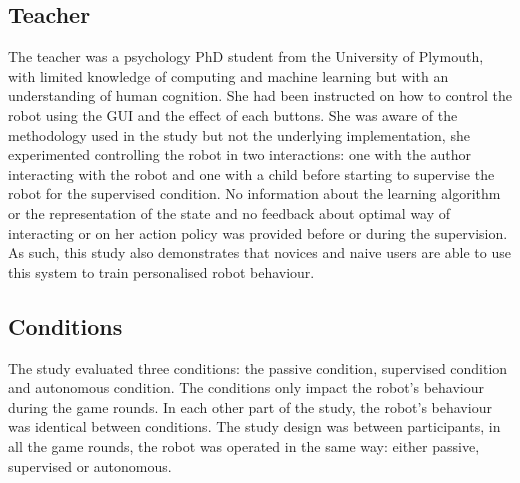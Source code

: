 \subsection{Teacher}
The teacher was a psychology PhD student from the University of Plymouth, with limited knowledge of computing and machine learning but with an understanding of human cognition. She had been instructed on how to control the robot using the GUI and the effect of each buttons. She was aware of the methodology used in the study but not the underlying implementation, she experimented controlling the robot in two interactions: one with the author interacting with the robot and one with a child before starting to supervise the robot for the supervised condition. No information about the learning algorithm or the representation of the state and no feedback about optimal way of interacting or on her action policy was provided before or during the supervision. As such, this study also demonstrates that novices and naive users are able to use this system to train personalised robot behaviour.



\subsection{Conditions}
The study evaluated three conditions: the passive condition, supervised condition and autonomous condition. The conditions only impact the robot's behaviour during the game rounds. In each other part of the study, the robot's behaviour was identical between conditions.
The study design was between participants, in all the game rounds, the robot was operated in the same way: either passive, supervised or autonomous.  %

